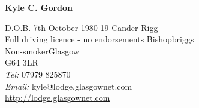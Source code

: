 \documentclass[10pt]{report}
\begin{document}
\pagestyle{headings}
\thispagestyle{empty}

\begin{flushleft}
\textbf{{\LARGE{}Kyle C. Gordon }}
\end{flushleft}

\hligne




\begin{flushleft}
D.O.B. 7th October 1980	\hfill 19 Cander Rigg\\
Full driving licence - no endorsements \hfill Bishopbriggs\\
Non-smoker\hfill Glasgow\\
\hfill G64 3LR\\
\hfill{\it Tel:} 07979 825870\\
\hfill{\it Email: }kyle@lodge.glasgownet.com\\
\hfill\url{http://lodge.glasgownet.com}
\end{flushleft}


\end{document}
